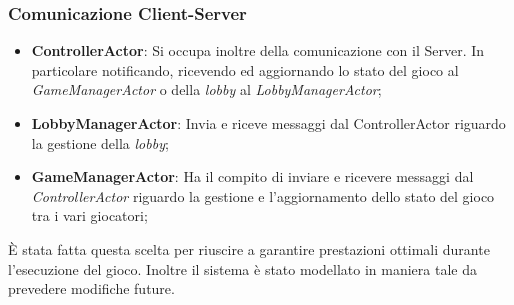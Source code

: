 \subsubsection{Comunicazione Client-Server}
\begin{itemize}
    \item \textbf{ControllerActor}: Si occupa inoltre della comunicazione con il Server. In particolare notificando, ricevendo ed aggiornando lo stato del gioco al \textit{GameManagerActor} o della \textit{lobby} al \textit{LobbyManagerActor};
    \item \textbf{LobbyManagerActor}: Invia e riceve messaggi dal ControllerActor riguardo la gestione della \textit{lobby};
    \item \textbf{GameManagerActor}: Ha il compito di inviare e ricevere messaggi dal \textit{ControllerActor} riguardo la gestione e l'aggiornamento dello stato del gioco tra i vari giocatori;
\end{itemize}
\`E stata fatta questa scelta per riuscire a garantire prestazioni ottimali durante l'esecuzione del gioco.
Inoltre il sistema \`e stato modellato in maniera tale da prevedere modifiche future.